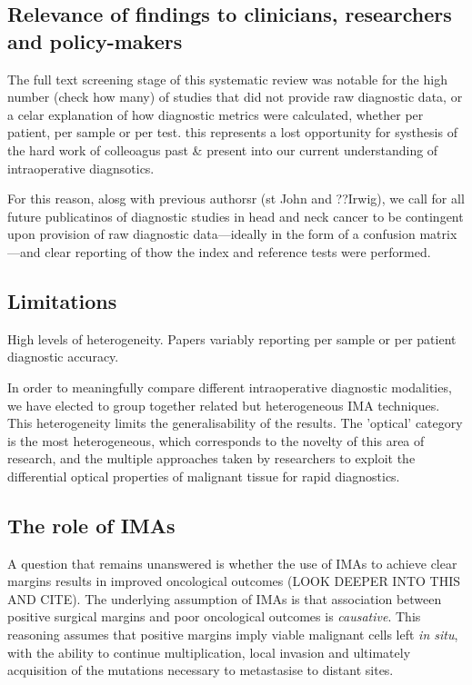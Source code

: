 \subsection{Relevance of findings to clinicians, researchers and policy-makers}

The full text screening stage of this systematic review was notable for the high number (check how many) of studies that did not provide raw diagnostic data, or a celar explanation of how diagnostic metrics were calculated, whether per patient, per sample or per test.
this represents a lost opportunity for systhesis of the hard work of colleoagus past \& present into our current understanding of intraoperative diagnsotics.

For this reason, alosg with previous authorsr (st John and ??Irwig), we call for all future publicatinos of diagnostic studies in head and neck cancer to be contingent upon provision of raw diagnostic data---ideally in the form of a confusion matrix---and clear reporting of thow the index and reference tests were performed.


\subsection{Limitations}

High levels of heterogeneity.
Papers variably reporting per sample or per patient diagnostic accuracy.

In order to meaningfully compare different intraoperative diagnostic modalities, we have elected to group together related but heterogeneous IMA techniques. 
This heterogeneity limits the generalisability of the results.
The 'optical' category is the most heterogeneous, which corresponds to the novelty of this area of research, and the multiple approaches taken by researchers to exploit the differential optical properties of malignant tissue for rapid diagnostics.


\subsection{The role of IMAs}

A question that remains unanswered is whether the use of IMAs to achieve clear margins results in improved oncological outcomes (LOOK DEEPER INTO THIS AND CITE).
The underlying assumption of IMAs is that association between positive surgical margins and poor oncological outcomes is \emph{causative}.
This reasoning assumes that positive margins imply viable malignant cells left \emph{in situ}, with the ability to continue multiplication, local invasion and ultimately acquisition of the mutations necessary to metastasise to distant sites.

